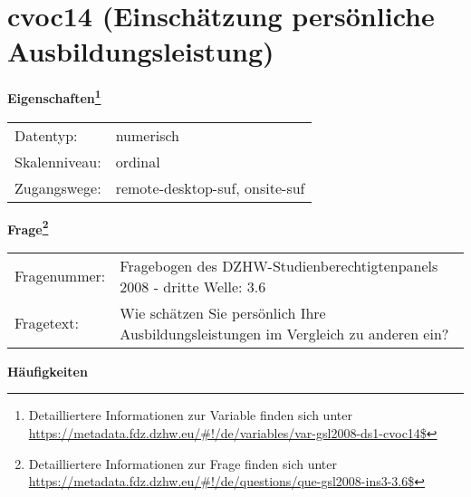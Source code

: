 
    \setcounter{footnote}{0}

    \vspace*{-1.8cm}
	\section{cvoc14 (Einschätzung persönliche Ausbildungsleistung)}
	\label{section:cvoc14}



    \vspace*{0.5cm}
    \noindent\textbf{Eigenschaften\footnote{Detailliertere Informationen zur Variable finden sich unter
		\url{https://metadata.fdz.dzhw.eu/\#!/de/variables/var-gsl2008-ds1-cvoc14$}}}\\
	\begin{tabularx}{\hsize}{@{}lX}
	Datentyp: & numerisch \\
	Skalenniveau: & ordinal \\
	Zugangswege: &
	  remote-desktop-suf, 
	  onsite-suf
 \\
    \end{tabularx}



				\vspace*{0.5cm}
                \noindent\textbf{Frage\footnote{Detailliertere Informationen zur Frage finden sich unter
		              \url{https://metadata.fdz.dzhw.eu/\#!/de/questions/que-gsl2008-ins3-3.6$}}}\\
				\begin{tabularx}{\hsize}{@{}lX}
					Fragenummer: &
					  Fragebogen des DZHW-Studienberechtigtenpanels 2008 - dritte Welle:
					  3.6
 \\
					Fragetext: & Wie schätzen Sie persönlich Ihre Ausbildungsleistungen im Vergleich zu anderen ein? \\
				\end{tabularx}





        		\vspace*{0.5cm}
                \noindent\textbf{Häufigkeiten}

